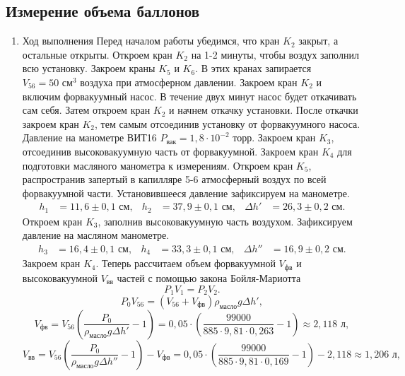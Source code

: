 \documentclass[a4paper]{article}
\begin{document}
\subsection{Измерение объема баллонов}
\begin{enumerate}
\item Ход выполнения
Перед началом работы убедимся, что кран $K_2$ закрыт, а остальные открыты. Откроем кран $K_2$ на 1-2 минуты, чтобы воздух заполнил всю установку. Закроем краны $K_5$ и $K_6$. В этих кранах запирается $V_{56} = 50 \text{ см}^3$ воздуха при атмосферном давлении. Закроем кран $K_2$ и включим форвакуумный насос. В течение двух минут насос будет откачивать сам себя. Затем откроем кран $K_2$ и начнем откачку установки. После откачки закроем кран $K_2$, тем самым отсоединив установку от форвакуумного насоса. Давление на манометре ВИТ16 $P_\text{вак} = 1,8 \cdot 10^{-2}$ торр. Закроем кран $K_3$, отсоединив высоковакуумную часть от форвакуумной. Закроем кран $K_4$ для подготовки масляного манометра к измерениям. Откроем кран $K_5$, распространив запертый в капилляре 5-6 атмосферный воздух по всей форвакуумной части. Установившееся давление зафиксируем на манометре.
\begin{align*}
    h_1 &= 11,6 \pm 0,1\text{ см}, & 
    h_2 &= 37,9 \pm 0,1\text{ см}, & 
    \Delta h' &= 26,3 \pm 0,2\text{ см}.
\end{align*}
Откроем кран $K_3$, заполнив высоковакуумную часть воздухом. Зафиксируем давление на масляном манометре.
\begin{align*}
	h_3 &= 16,4 \pm 0,1\text{ см}, & 
	h_4 &= 33,3 \pm 0,1\text{ см}, & 
	\Delta h'' &= 16,9 \pm 0,2\text{ см}.
\end{align*}
Закроем кран $K_4$. Теперь рассчитаем объем  форвакуумной $V_\text{фв}$ и высоковакуумной $V_\text{вв}$ частей с помощью закона Бойля-Мариотта
\begin{equation*}
	P_1V_1= P_2V_2.
\end{equation*}
\begin{equation*}
	P_0V_{56} = (V_{56} + V_\text{фв})\rho_{\text{масло}} g \Delta h',
\end{equation*}
\begin{equation*}
	V_\text{фв} = V_{56}(\frac{P_0}{\rho_{\text{масло}} g \Delta h'} - 1) = 0,05 \cdot (\frac{99000}{885 \cdot 9,81 \cdot 0,263} - 1) \approx 2,118 \text{ л},
\end{equation*}
\begin{equation*}
	V_\text{вв} = V_{56}(\frac{P_0}{\rho_{\text{масло}} g \Delta h''} - 1) - V_\text{фв} = 0,05 \cdot (\frac{99000}{885 \cdot 9,81 \cdot 0,169} - 1) - 2,118 \approx  1,206 \text{ л},

\end{equation*}
\end{enumerate}
\end{document}
